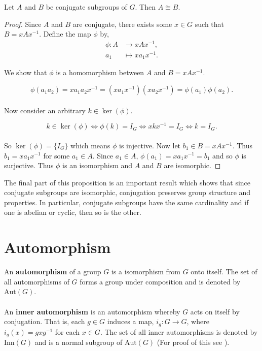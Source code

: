 \begin{proposition}
Let $A$ and $B$ be conjugate subgroups of $G$. Then $A \cong B$.
\end{proposition}

\begin{proof}
Since $A$ and $B$ are conjugate, there exists some $x \in G$ such that $B=xAx^{-1}$. Define the map $\phi$ by,
\begin{align*}
\phi:A &\longrightarrow xAx^{-1}, \\
a_1 &\longmapsto xa_1x^{-1} \tag{$\forall \; a_1 \in A$}. 
\end{align*}

We show that $\phi$ is a homomorphism between $A$ and $B=xAx^{-1}$.

\begin{equation*}
\phi(a_1a_2) = x a_1 a_2 x^{-1} = ( xa_1x^{-1})( xa_2x^{-1}) = \phi(a_1) \phi(a_2).
\end{equation*}
\\
Now consider an arbitrary $k \in \ker(\phi)$.

\begin{equation*}
k \in \ker(\phi) \iff \phi(k) = I_G \iff  xkx^{-1} = I_G \iff k = I_G.
\end{equation*}
\\
So $\ker(\phi) = \{ I_G \}$ which means $\phi$ is injective. Now let $b_1 \in B = xAx^{-1}$.
Thus $b_1 = xa_1x^{-1}$ for some $a_1 \in A$. Since $a_1 \in A$, $\phi(a_1) = xa_1x^{-1} = b_1$ and so $\phi$ is surjective. 
Thus $\phi$ is an isomorphism and $A$ and $B$ are isomorphic.

\end{proof}

The final part of this proposition is an important result which shows that since conjugate subgroups are isomorphic, 
conjugation preserves group structure and properties. 
In particular, conjugate subgroups have the same cardinality and if one is abelian or cyclic, then so is the other.

\section{Automorphism}

\begin{definition} An \textbf{automorphism} of a group $G$ is a isomorphism from $G$ onto itself. 
    The set of all automorphisms of $G$ forms a group under composition and is denoted by $\textrm{Aut}(G)$.\\
\\
An \textbf{inner automorphism} is an automorphism whereby $G$ acts on itself by conjugation. 
That is, each $g \in G$ induces a map, $i_g : G \rightarrow G$, where $i_g(x) = g x g^{-1}$ for each $x \in G$. The set of all inner automorphisms is denoted by 
$\textrm{Inn}(G)$ and is a normal subgroup of $\textrm{Aut}(G)$ (For proof of this see \cite[p.104]{bhattacharya}).
\end{definition}

